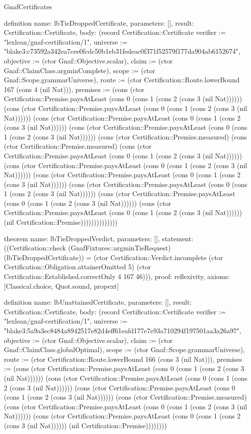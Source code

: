 \begin{lexlean}{GnafCertificates}
\begin{semanticmodule}
definition{
  name: lbTieDroppedCertificate,
  parameters: [],
  result: Certification::Certificate,
  body: (record Certification::Certificate {verifier := "lexlean/gnaf-certification/1", universe := "blake3:c73592a342ea7cee0fcdc50b1eb31fedeac0f371f52579f177da904ab6152674", objective := (ctor Gnaf::Objective.scalar), claim := (ctor Gnaf::ClaimClass.argminComplete), scope := (ctor Gnaf::Scope.grammarUniverse), route := (ctor Certification::Route.lowerBound 167 (cons 4 (nil Nat))), premises := (cons (ctor Certification::Premise.paysAtLeast (cons 0 (cons 1 (cons 2 (cons 3 (nil Nat)))))) (cons (ctor Certification::Premise.paysAtLeast (cons 0 (cons 1 (cons 2 (cons 3 (nil Nat)))))) (cons (ctor Certification::Premise.paysAtLeast (cons 0 (cons 1 (cons 2 (cons 3 (nil Nat)))))) (cons (ctor Certification::Premise.paysAtLeast (cons 0 (cons 1 (cons 2 (cons 3 (nil Nat)))))) (cons (ctor Certification::Premise.measured) (cons (ctor Certification::Premise.measured) (cons (ctor Certification::Premise.paysAtLeast (cons 0 (cons 1 (cons 2 (cons 3 (nil Nat)))))) (cons (ctor Certification::Premise.paysAtLeast (cons 0 (cons 1 (cons 2 (cons 3 (nil Nat)))))) (cons (ctor Certification::Premise.paysAtLeast (cons 0 (cons 1 (cons 2 (cons 3 (nil Nat)))))) (cons (ctor Certification::Premise.paysAtLeast (cons 0 (cons 1 (cons 2 (cons 3 (nil Nat)))))) (cons (ctor Certification::Premise.paysAtLeast (cons 0 (cons 1 (cons 2 (cons 3 (nil Nat)))))) (cons (ctor Certification::Premise.paysAtLeast (cons 0 (cons 1 (cons 2 (cons 3 (nil Nat)))))) (nil Certification::Premise)))))))))))))})
}

theorem{
  name: lbTieDroppedVerdict,
  parameters: [],
  statement: ((Certification::check (GnafFixtures::argminTieRequest) (lbTieDroppedCertificate)) = (ctor Certification::Verdict.incomplete (ctor Certification::Obligation.attainerOmitted 5) (ctor Certification::Established.correctOnly 4 167 46))),
  proof: reflexivity{},
  axioms: [Classical.choice, Quot.sound, propext]
}

definition{
  name: lbUnattainedCertificate,
  parameters: [],
  result: Certification::Certificate,
  body: (record Certification::Certificate {verifier := "lexlean/gnaf-certification/1", universe := "blake3:5a9a3ec8484a8942517e82d4eff61eafd177e7e93a710294f197501aa3a26a97", objective := (ctor Gnaf::Objective.scalar), claim := (ctor Gnaf::ClaimClass.globalOptimal), scope := (ctor Gnaf::Scope.grammarUniverse), route := (ctor Certification::Route.lowerBound 166 (cons 3 (nil Nat))), premises := (cons (ctor Certification::Premise.paysAtLeast (cons 0 (cons 1 (cons 2 (cons 3 (nil Nat)))))) (cons (ctor Certification::Premise.paysAtLeast (cons 0 (cons 1 (cons 2 (cons 3 (nil Nat)))))) (cons (ctor Certification::Premise.paysAtLeast (cons 0 (cons 1 (cons 2 (cons 3 (nil Nat)))))) (cons (ctor Certification::Premise.measured) (cons (ctor Certification::Premise.paysAtLeast (cons 0 (cons 1 (cons 2 (cons 3 (nil Nat)))))) (cons (ctor Certification::Premise.paysAtLeast (cons 0 (cons 1 (cons 2 (cons 3 (nil Nat)))))) (nil Certification::Premise)))))))})
}


\end{semanticmodule}
\end{lexlean}
